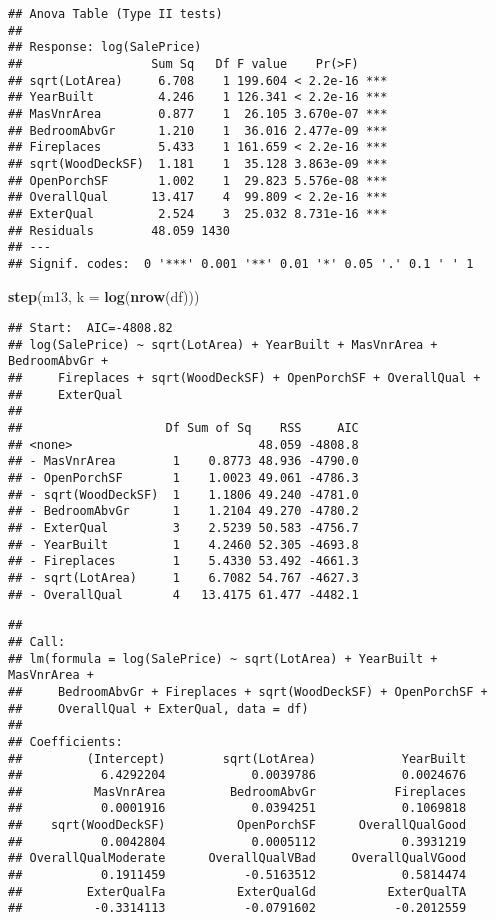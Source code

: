 \documentclass[
]{article}
\newenvironment{Shaded}{\begin{snugshade}}{\end{snugshade}}
\newcommand{\AttributeTok}[1]{\textcolor[rgb]{0.13,0.29,0.53}{#1}}
\newcommand{\FunctionTok}[1]{\textcolor[rgb]{0.13,0.29,0.53}{\textbf{#1}}}
\newcommand{\NormalTok}[1]{#1}
\begin{document}
\begin{verbatim}
## Anova Table (Type II tests)
## 
## Response: log(SalePrice)
##                  Sum Sq   Df F value    Pr(>F)    
## sqrt(LotArea)     6.708    1 199.604 < 2.2e-16 ***
## YearBuilt         4.246    1 126.341 < 2.2e-16 ***
## MasVnrArea        0.877    1  26.105 3.670e-07 ***
## BedroomAbvGr      1.210    1  36.016 2.477e-09 ***
## Fireplaces        5.433    1 161.659 < 2.2e-16 ***
## sqrt(WoodDeckSF)  1.181    1  35.128 3.863e-09 ***
## OpenPorchSF       1.002    1  29.823 5.576e-08 ***
## OverallQual      13.417    4  99.809 < 2.2e-16 ***
## ExterQual         2.524    3  25.032 8.731e-16 ***
## Residuals        48.059 1430                      
## ---
## Signif. codes:  0 '***' 0.001 '**' 0.01 '*' 0.05 '.' 0.1 ' ' 1
\end{verbatim}

\begin{Shaded}
\begin{Highlighting}[]
\FunctionTok{step}\NormalTok{(m13, }\AttributeTok{k =} \FunctionTok{log}\NormalTok{(}\FunctionTok{nrow}\NormalTok{(df)))}
\end{Highlighting}
\end{Shaded}

\begin{verbatim}
## Start:  AIC=-4808.82
## log(SalePrice) ~ sqrt(LotArea) + YearBuilt + MasVnrArea + BedroomAbvGr + 
##     Fireplaces + sqrt(WoodDeckSF) + OpenPorchSF + OverallQual + 
##     ExterQual
## 
##                    Df Sum of Sq    RSS     AIC
## <none>                          48.059 -4808.8
## - MasVnrArea        1    0.8773 48.936 -4790.0
## - OpenPorchSF       1    1.0023 49.061 -4786.3
## - sqrt(WoodDeckSF)  1    1.1806 49.240 -4781.0
## - BedroomAbvGr      1    1.2104 49.270 -4780.2
## - ExterQual         3    2.5239 50.583 -4756.7
## - YearBuilt         1    4.2460 52.305 -4693.8
## - Fireplaces        1    5.4330 53.492 -4661.3
## - sqrt(LotArea)     1    6.7082 54.767 -4627.3
## - OverallQual       4   13.4175 61.477 -4482.1
\end{verbatim}

\begin{verbatim}
## 
## Call:
## lm(formula = log(SalePrice) ~ sqrt(LotArea) + YearBuilt + MasVnrArea + 
##     BedroomAbvGr + Fireplaces + sqrt(WoodDeckSF) + OpenPorchSF + 
##     OverallQual + ExterQual, data = df)
## 
## Coefficients:
##         (Intercept)        sqrt(LotArea)            YearBuilt  
##           6.4292204            0.0039786            0.0024676  
##          MasVnrArea         BedroomAbvGr           Fireplaces  
##           0.0001916            0.0394251            0.1069818  
##    sqrt(WoodDeckSF)          OpenPorchSF      OverallQualGood  
##           0.0042804            0.0005112            0.3931219  
## OverallQualModerate      OverallQualVBad     OverallQualVGood  
##           0.1911459           -0.5163512            0.5814474  
##         ExterQualFa          ExterQualGd          ExterQualTA  
##          -0.3314113           -0.0791602           -0.2012559
\end{verbatim}
\end{document}
